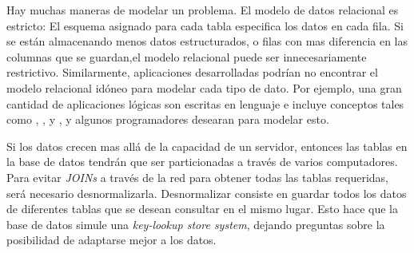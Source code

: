 Hay muchas maneras de modelar un problema. El modelo de datos relacional es estricto: El esquema asignado para cada tabla especifica los datos en cada fila. Si se están almacenando menos datos estructurados, o filas con mas diferencia en las columnas que se guardan,el modelo relacional puede ser innecesariamente restrictivo. Similarmente, aplicaciones desarrolladas podrían no encontrar el modelo relacional idóneo para modelar cada tipo de dato. Por ejemplo, una gran cantidad de aplicaciones lógicas son escritas en lenguaje \objectoriented e incluye conceptos \highlevel tales como \lists, \queues, y \sets, y algunos programadores desearan \persistencelayer para modelar esto.

Si los datos crecen mas allá de la capacidad de un servidor, entonces las tablas en la base de datos tendrán que ser particionadas a través de varios computadores. Para evitar \textit{JOINs} a través de la red para obtener todas las tablas requeridas, será necesario desnormalizarla. Desnormalizar consiste en guardar todos los datos de diferentes tablas que se desean consultar en el mismo lugar. Esto hace que la base de datos simule una \textit{key-lookup store system}, dejando preguntas sobre la posibilidad de adaptarse mejor a los datos.

